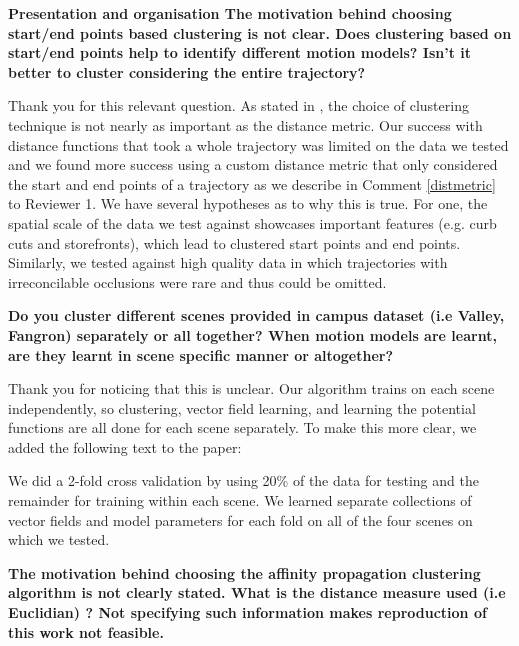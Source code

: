 \documentclass[usenames,dvipsnames]{article}
\providecommand{\response}[1]{
\noindent
\noindent\colorbox{gray!20}{
\parbox{\textwidth}{
\setlength{\parskip}{.1in}
\setlength{\parindent}{.1in}
#1}
}
}
\begin{document}
\begin{enumerate}
\begin{item}
\textbf{Presentation and organisation
The motivation behind choosing start/end points based clustering is not
clear. Does clustering based on start/end points help to identify
different motion models? Isn't it better to cluster considering the
entire trajectory? }
\end{item}

Thank you for this relevant question.
As stated in \cite{Morris2009}, the choice of clustering technique is not nearly as important as the distance metric. 
Our success with distance functions that took a whole trajectory was limited on the data we tested and we found more success using a custom distance metric that only considered the start and end points of a trajectory as we describe in Comment \ref{distmetric} to Reviewer 1. 
We have several hypotheses as to why this is true.  
For one, the spatial scale of the data we test against showcases important features (e.g. curb cuts and storefronts), which lead to clustered start points and end points. 
Similarly, we tested against high quality data in which trajectories with irreconcilable occlusions were rare and thus could be omitted. 


\begin{item}
\textbf{Do you cluster different scenes provided in campus dataset \cite{Alahi2016} (i.e
Valley, Fangron) separately or all together? When motion models are
learnt, are they learnt in scene specific manner or altogether?}
\end{item}

Thank you for noticing that this is unclear. 
Our algorithm trains on each scene independently, so clustering, vector field learning, and learning the potential functions are all done for each scene separately. 
To make this more clear, we added the following text to the paper:

\reversemarginpar{}
\response{We did a 2-fold cross validation by using 20\% of the data for testing and the remainder for training within each scene. 
We learned separate collections of vector fields and model parameters for each fold on all of the four scenes on which we tested.}


\begin{item} \label{distmetric}
\textbf{The motivation behind choosing the affinity propagation clustering algorithm is not clearly stated. 
What is the distance measure used (i.e Euclidian) ? 
Not specifying such information makes reproduction of this work not feasible. }


\end{item}
\end{enumerate}
\end{document}
